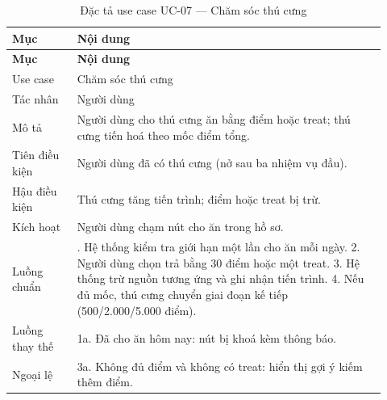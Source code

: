 \begingroup\small\renewcommand{\arraystretch}{1.15}\setlength{\tabcolsep}{3pt}
\begin{longtable}{>{\RaggedRight\arraybackslash}p{0.16\linewidth}>{\RaggedRight\arraybackslash}p{0.76\linewidth}}
\caption{Đặc tả use case UC-07 --- Chăm sóc thú cưng}
\label{tab:spec-uc-07}\\
\toprule
\textbf{Mục} & \textbf{Nội dung} \\
\midrule
\endfirsthead
\toprule
\textbf{Mục} & \textbf{Nội dung} \\
\midrule
\endhead
\bottomrule
\endfoot
Use case & Chăm sóc thú cưng \\
Tác nhân & Người dùng \\
Mô tả & Người dùng cho thú cưng ăn bằng điểm hoặc treat; thú cưng tiến hoá theo mốc điểm tổng. \\
Tiên điều kiện & Người dùng đã có thú cưng (nở sau ba nhiệm vụ đầu). \\
Hậu điều kiện & Thú cưng tăng tiến trình; điểm hoặc treat bị trừ. \\
Kích hoạt & Người dùng chạm nút cho ăn trong hồ sơ. \\
Luồng chuẩn & 1. Hệ thống kiểm tra giới hạn một lần cho ăn mỗi ngày. 2. Người dùng chọn trả bằng 30 điểm hoặc một treat. 3. Hệ thống trừ nguồn tương ứng và ghi nhận tiến trình. 4. Nếu đủ mốc, thú cưng chuyển giai đoạn kế tiếp (500/2.000/5.000 điểm). \\
Luồng thay thế & 1a. Đã cho ăn hôm nay: nút bị khoá kèm thông báo. \\
Ngoại lệ & 3a. Không đủ điểm và không có treat: hiển thị gợi ý kiếm thêm điểm. \\
\end{longtable}
\endgroup

